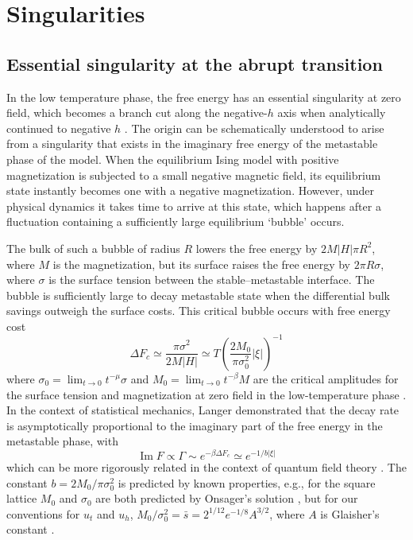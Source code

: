 \documentclass[
aps,
pre,
preprint,
longbibliography,
floatfix
]{revtex4-2}
\begin{document}
\section{Singularities}

\subsection{Essential singularity at the abrupt transition}

In the low temperature phase, the free energy has an essential singularity at
zero field, which becomes a branch cut along the negative-$h$ axis when
analytically continued to negative $h$ \cite{Langer_1967_Theory}. The origin
can be schematically understood to arise from a singularity that exists in the
imaginary free energy of the metastable phase of the model. When the
equilibrium Ising model with positive magnetization is subjected to a small
negative magnetic field, its equilibrium state instantly becomes one with a
negative magnetization. However, under physical dynamics it takes time to
arrive at this state, which happens after a fluctuation containing a
sufficiently large equilibrium `bubble' occurs.

The bulk of such a bubble of radius $R$ lowers the free energy by $2M|H|\pi
R^2$, where  $M$ is the magnetization, but its surface raises the free energy
by $2\pi R\sigma$, where $\sigma$ is the surface tension between the
stable--metastable interface. The bubble is sufficiently large to decay
metastable state when the differential bulk savings outweigh the surface costs.
This critical bubble occurs with free energy cost
\begin{equation}
  \Delta F_c
    \simeq\frac{\pi\sigma^2}{2M|H|}
    \simeq T\left(\frac{2M_0}{\pi\sigma_0^2}|\xi|\right)^{-1}
\end{equation}
where $\sigma_0=\lim_{t\to0}t^{-\mu}\sigma$ and $M_0=\lim_{t\to0}t^{-\beta}M$
are the critical amplitudes for the surface tension and magnetization at zero
field in the low-temperature phase \cite{Kent-Dobias_2020_Novel}.  In the
context of statistical mechanics, Langer demonstrated that the decay rate is
asymptotically proportional to the imaginary part of the free energy in the
metastable phase, with
\begin{equation}
  \operatorname{Im}F\propto\Gamma\sim e^{-\beta\Delta F_c}\simeq e^{-1/b|\xi|}
\end{equation}
which can be more rigorously related in the context of quantum field theory
\cite{Voloshin_1985_Decay}. The constant $b=2M_0/\pi\sigma_0^2$ is predicted by
known properties, e.g., for the square lattice $M_0$ and $\sigma_0$ are both
predicted by Onsager's solution \cite{Onsager_1944_Crystal}, but for our
conventions for $u_t$ and $u_h$, $M_0/\sigma_0^2=\bar
s=2^{1/12}e^{-1/8}A^{3/2}$, where $A$ is Glaisher's constant
\cite{Fonseca_2003_Ising}.
\end{document}
